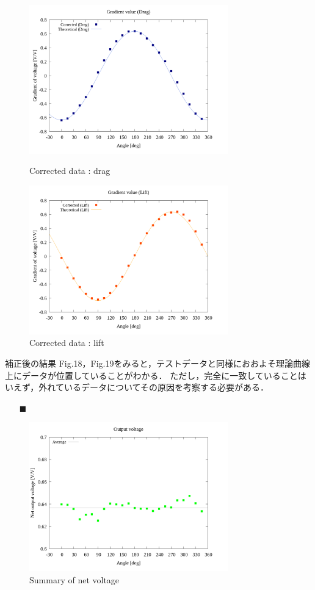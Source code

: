 \documentclass[twocolumn,a4j]{jsarticle}
\begin{document}
\begin{figure}[htbp]
    \footnotesize
    \begin{center}
        \includegraphics[width=86mm]{../graphes/1-ex/21/21-2_corrected_drag.png}
        \caption{Corrected data : drag}
        \includegraphics[width=86mm]{../graphes/1-ex/21/21-2_corrected_lift.png}
        \caption{Corrected data : lift}
    \end{center}
\end{figure}

補正後の結果 Fig.18，Fig.19をみると，テストデータと同様におおよそ理論曲線上にデータが位置していることがわかる．
ただし，完全に一致していることはいえず，外れているデータについてその原因を考察する必要がある．

\newpage

\begin{itemize}
    \item [$\blacksquare$] 
\end{itemize}

\begin{figure}[htbp]
    \footnotesize
    \begin{center}
        \includegraphics[width=86mm]{../graphes/1-ex/05/05_summary-outputvoltage.png}
        \caption{Summary of net voltage}
    \end{center}
\end{figure}
\end{document}
